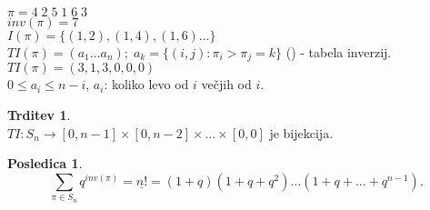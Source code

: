 \documentclass[a4paper, 12pt]{book}
\theoremstyle{definition}
\newtheorem{conseq}[counter]{Posledica}
\newtheorem{claim}[counter]{Trditev}
\theoremstyle{remark}
\begin{document}
$\pi = 4\;2\;5\;1\;6\;3$ \\
$inv(\pi) = 7$ \\
$I(\pi) = \{(1,2), (1,4), (1,6) \dots\}$ \\
$TI(\pi) = (a_1 \dots a_n); \; a_k = \{(i,j): \pi_i > \pi_j = k\}$ () - tabela inverzij. \\
$TI(\pi) = (3,1,3,0,0,0)$ \\
$0 \leq a_i \leq n-i$, $a_i$: koliko levo od $i$ večjih od $i$.
\begin{claim} \text{} \\
  $TI: S_n \to [0,n-1] \times [0,n-2] \times \dots \times [0,0]$ je bijekcija.
\end{claim}
\begin{conseq}
  \begin{equation*}
    \sum_{\pi \in S_n} q^{inv(\pi)} = \underline{n!} = (1+q) (1+q+q^2) \dots (1+q+\dots+q^{n-1}).
  \end{equation*}
\end{conseq}


\end{document}
